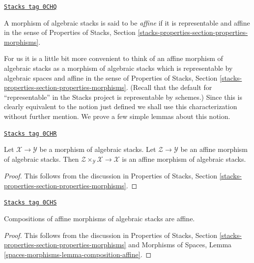 \begin{definition}[Affine]
\label{stacks-morphisms-definition-affine}
\href{https://stacks.math.columbia.edu/tag/0CHQ}{\texttt{Stacks tag 0CHQ}}

A morphism of algebraic stacks is said to be {\it affine}
if it is representable and affine in the sense of
Properties of Stacks, Section
\ref{stacks-properties-section-properties-morphisms}.
\end{definition}

For us it is a little bit more convenient to think of an affine
morphism of algebraic stacks as a morphism of algebraic stacks which is
representable by algebraic spaces and affine in the sense of
Properties of Stacks, Section
\ref{stacks-properties-section-properties-morphisms}.
(Recall that the default for ``representable'' in the Stacks project
is representable by schemes.)
Since this is clearly equivalent to the notion just defined we shall
use this characterization without further mention.
We prove a few simple lemmas about this notion.

\begin{lemma}
\label{stacks-morphisms-lemma-base-change-affine}
\href{https://stacks.math.columbia.edu/tag/0CHR}{\texttt{Stacks tag 0CHR}}

Let $\mathcal{X} \to \mathcal{Y}$ be a morphism of algebraic stacks.
Let $\mathcal{Z} \to \mathcal{Y}$ be an affine morphism of algebraic
stacks. Then $\mathcal{Z} \times_\mathcal{Y} \mathcal{X} \to \mathcal{X}$
is an affine morphism of algebraic stacks.
\end{lemma}

\begin{proof}
This follows from the discussion in
Properties of Stacks, Section
\ref{stacks-properties-section-properties-morphisms}.
\end{proof}

\begin{lemma}
\label{stacks-morphisms-lemma-composition-affine}
\href{https://stacks.math.columbia.edu/tag/0CHS}{\texttt{Stacks tag 0CHS}}

Compositions of affine morphisms of algebraic stacks are affine.
\end{lemma}

\begin{proof}
This follows from the discussion in
Properties of Stacks, Section
\ref{stacks-properties-section-properties-morphisms}
and
Morphisms of Spaces, Lemma \ref{spaces-morphisms-lemma-composition-affine}.
\end{proof}

